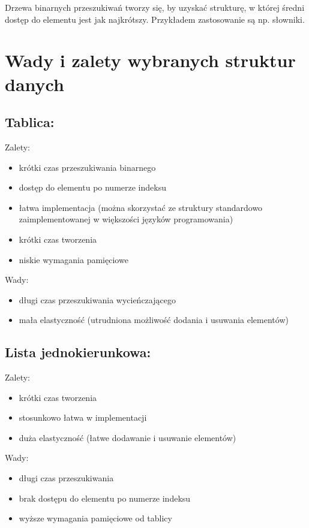 \documentclass[polish,polish,a4paper]{article}
\begin{document}
Drzewa binarnych przeszukiwań tworzy się, by uzyskać strukturę, w której średni dostęp do elementu jest jak najkrótszy. Przykładem zastosowanie są np. słowniki.


\section{Wady i zalety wybranych struktur danych}
\subsection{Tablica:}
Zalety:
\begin{itemize}
	\item krótki czas przeszukiwania binarnego
	\item dostęp do elementu po numerze indeksu
	\item łatwa implementacja (można skorzystać ze struktury standardowo zaimplementowanej w większości języków programowania)
	\item krótki czas tworzenia
	\item niskie wymagania pamięciowe
\end{itemize}
Wady:
\begin{itemize}
	\item długi czas przeszukiwania wycieńczającego
	\item mała elastyczność (utrudniona możliwość dodania i usuwania elementów)
\end{itemize}


\subsection{Lista jednokierunkowa:}
Zalety:
\begin{itemize}
	\item krótki czas tworzenia
	\item stosunkowo łatwa w implementacji 
	\item duża elastyczność (łatwe dodawanie i usuwanie elementów)
\end{itemize}
Wady:
\begin{itemize}
	\item długi czas przeszukiwania
	\item brak dostępu do elementu po numerze indeksu
	\item wyższe wymagania pamięciowe od tablicy
\end{itemize}
\end{document}
